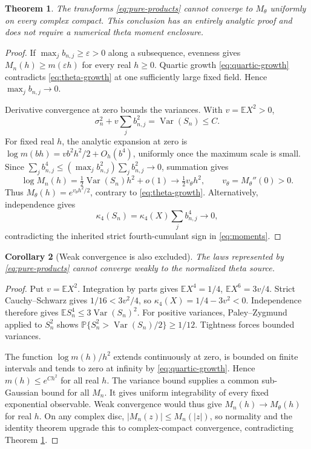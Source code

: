 \documentclass[11pt]{article}
\newtheorem{theorem}{Theorem}[section]
\newtheorem{corollary}[theorem]{Corollary}
\theoremstyle{remark}
\newcommand{\E}{\mathbb E}
\newcommand{\Var}{\operatorname{Var}}
\numberwithin{equation}{section}
\begin{document}
\begin{theorem}\label{thm:pure}
The transforms \eqref{eq:pure-products} cannot converge to \(M_\theta\)
uniformly on every complex compact. This conclusion has an entirely
analytic proof and does not require a numerical theta moment enclosure.
\end{theorem}
\begin{proof}
If \(\max_jb_{n,j}\ge\varepsilon>0\) along a subsequence, evenness gives
\(M_n(h)\ge m(\varepsilon h)\) for every real \(h\ge0\). Quartic growth
\eqref{eq:quartic-growth} contradicts \eqref{eq:theta-growth} at one
sufficiently large fixed field. Hence \(\max_jb_{n,j}\to0\).

Derivative convergence at zero bounds the variances. With \(v=\E X^2>0\),
\[
 \sigma_n^2+v\sum_jb_{n,j}^2=\Var(S_n)\le C.
\]
For fixed real \(h\), the analytic expansion at zero is
\(\log m(bh)=vb^2h^2/2+O_h(b^4)\), uniformly once the maximum scale is
small. Since
\(\sum_jb_{n,j}^4\le(\max_jb_{n,j}^2)\sum_jb_{n,j}^2\to0\), summation
gives
\[
 \log M_n(h)=\tfrac12\Var(S_n)h^2+o(1)
 \longrightarrow \tfrac12 v_\theta h^2,\qquad
 v_\theta=M_\theta''(0)>0.
\]
Thus \(M_\theta(h)=e^{v_\theta h^2/2}\), contrary to
\eqref{eq:theta-growth}. Alternatively, independence gives
\[
 \kappa_4(S_n)=\kappa_4(X)\sum_jb_{n,j}^4\longrightarrow0,
\]
contradicting the inherited strict fourth-cumulant sign in
\eqref{eq:moments}.
\end{proof}

\begin{corollary}[Weak convergence is also excluded]\label{cor:weak-pure}
The laws represented by \eqref{eq:pure-products} cannot converge weakly
to the normalized theta source.
\end{corollary}
\begin{proof}
Put \(v=\E X^2\). Integration by parts gives
\(\E X^4=1/4\), \(\E X^6=3v/4\). Strict Cauchy--Schwarz gives
\(1/16<3v^2/4\), so \(\kappa_4(X)=1/4-3v^2<0\).
Independence therefore gives
\(\E S_n^4\le3\Var(S_n)^2\). For positive variances,
Paley--Zygmund applied to \(S_n^2\)
shows
\(\mathbb P\{S_n^2>\Var(S_n)/2\}\ge1/12\).
Tightness forces bounded variances.

The function \(\log m(h)/h^2\) extends continuously at zero, is bounded
on finite intervals and tends to zero at infinity by
\eqref{eq:quartic-growth}. Hence \(m(h)\le e^{Ch^2}\) for all real \(h\).
The variance bound supplies a common sub-Gaussian bound for all \(M_n\).
It gives uniform integrability of every fixed exponential observable.
Weak convergence would thus give \(M_n(h)\to M_\theta(h)\) for real
\(h\). On any complex disc,
\(|M_n(z)|\le M_n(|z|)\), so normality and the identity theorem upgrade
this to complex-compact convergence, contradicting Theorem \ref{thm:pure}.
\end{proof}
\end{document}
